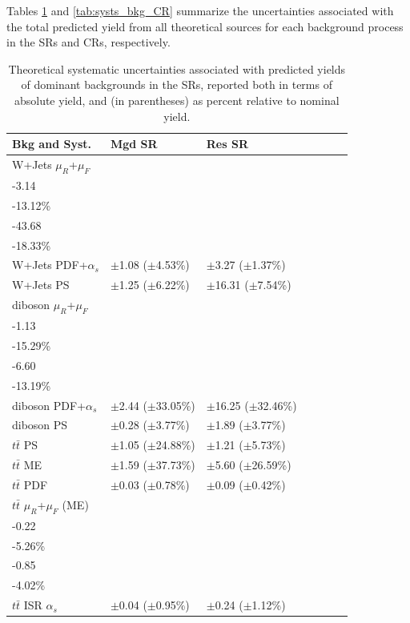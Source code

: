 Tables \ref{tab:systs_bkg_SR} and \ref{tab:systs_bkg_CR} summarize the uncertainties associated with the total predicted yield from all theoretical sources for each background process in the SRs and CRs, respectively. 

\begin{table}[ht]
\small{
\caption{\label{tab:systs_bkg_SR} Theoretical systematic uncertainties associated with predicted yields of dominant backgrounds in the SRs, reported both in terms of absolute yield, and (in parentheses) as percent relative to nominal yield.}
\begin{tabular}{l l l l l l l }
\toprule
\textbf{Bkg and Syst.} & \textbf{Mgd SR} & \textbf{Res SR}\tabularnewline
\midrule
\midrule
W+Jets \(\mu_R\)+\(\mu_F\) & \(\substack{+6.33\\-3.14}\) \big(\(\substack{+26.45\%\\-13.12\%}\)\big) & \(\substack{+35.68\\-43.68}\) \big(\(\substack{+14.97\%\\-18.33\%}\)\big) \tabularnewline
\midrule
W+Jets PDF+\(\alpha_s\) & \(\pm\)1.08 (\(\pm\)4.53\%) & \(\pm\)3.27 (\(\pm\)1.37\%) \tabularnewline
\midrule
W+Jets PS & \(\pm\)1.25 (\(\pm\)6.22\%) & \(\pm\)16.31 (\(\pm\)7.54\%) \tabularnewline
\midrule
diboson \(\mu_R\)+\(\mu_F\) & \(\substack{+1.29\\-1.13}\) \big(\(\substack{+17.39\%\\-15.29\%}\)\big) & \(\substack{+7.62\\-6.60}\) \big(\(\substack{+15.22\%\\-13.19\%}\)\big) \tabularnewline
\midrule
diboson PDF+\(\alpha_s\) & \(\pm\)2.44 (\(\pm\)33.05\%) &\(\pm\)16.25 (\(\pm\)32.46\%) \tabularnewline
\midrule
diboson PS & \(\pm\)0.28 (\(\pm\)3.77\%) &\(\pm\)1.89 (\(\pm\)3.77\%) \tabularnewline
\midrule
\(t\bar{t}\) PS & \(\pm\)1.05 (\(\pm\)24.88\%) & \(\pm\)1.21 (\(\pm\)5.73\%) \tabularnewline
\midrule
\(t\bar{t}\) ME & \(\pm\)1.59 (\(\pm\)37.73\%) & \(\pm\)5.60 (\(\pm\)26.59\%) \tabularnewline
\midrule
\(t\bar{t}\) PDF & \(\pm\)0.03 (\(\pm\)0.78\%) & \(\pm\)0.09 (\(\pm\)0.42\%) \tabularnewline
\midrule
\(t\bar{t}\) \(\mu_R\)+\(\mu_F\) (ME) & \(\substack{+0.16\\-0.22}\) \big(\(\substack{+3.81\%\\-5.26\%}\)\big) & \(\substack{+0.58\\-0.85}\) \big(\(\substack{+2.74\%\\-4.02\%}\)\big) \tabularnewline
\midrule
\(t\bar{t}\) ISR \(\alpha_s\) & \(\pm\)0.04 (\(\pm\)0.95\%) & \(\pm\)0.24 (\(\pm\)1.12\%) \tabularnewline

\end{tabular}}
\end{table}
